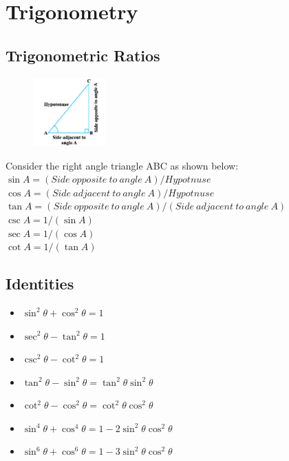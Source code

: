 \documentclass{book}
\begin{document}
	\chapter{Trigonometry}
	\section{Trigonometric Ratios}
	 \begin{figure}
	 	\includegraphics[scale=0.9,width=0.25\textwidth]{rat1}
	 \end{figure}
	Consider the right angle triangle ABC as shown below: \\
	 $\sin A = (Side \: opposite \:  to \: angle \: A) / Hypotnuse$ \\
	 $\cos A =(Side \: adjacent \: to \: angle \: A) / Hypotnuse$ \\
	 $\tan A = (Side \: opposite \: to \: angle \: A) / (Side \: adjacent\: to\: angle\: A)$ \\
	 $\csc A = 1 / (\sin A)$ \\
	 $\sec A = 1/(\cos A)$ \\
	 $\cot A = 1/(\tan A)$ \\
	 \section{Identities}
	 \begin{mdframed}[backgroundcolor=yellow]
		\begin{itemize}
			\item $\sin^2\theta + \cos^2\theta = 1$
			\item $\sec^2\theta - \tan^2\theta = 1$
			\item $\csc^2\theta - \cot^2\theta = 1$
			\item $\tan^2\theta - \sin^2\theta = \tan^2\theta\sin^2\theta$
			\item $\cot^2\theta - \cos^2\theta = \cot^2\theta\cos^2\theta$
			\item $\sin^4\theta + \cos^4\theta = 1-2\sin^2\theta\cos^2\theta$
			\item $\sin^6\theta + \cos^6\theta = 1 -3\sin^2\theta\cos^2\theta$
		\end{itemize}
	 \end{mdframed}
	 
\end{document}
